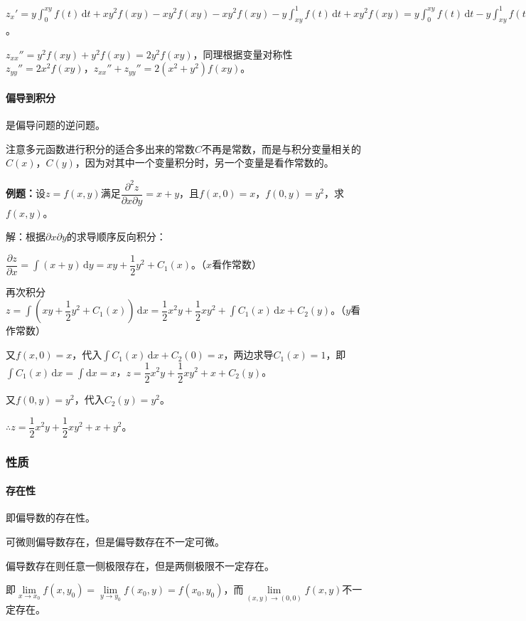 \documentclass[UTF8, 12pt]{ctexart}
\begin{document}
$z_x'=y\int_0^{xy}f(t)\,\textrm{d}t+xy^2f(xy)-xy^2f(xy)-xy^2f(xy)-y\int_{xy}^1f(t)\,\textrm{d}t+xy^2f(xy)=y\int_0^{xy}f(t)\,\textrm{d}t-y\int_{xy}^1f(t)\,\textrm{d}t$。

$z_{xx}''=y^2f(xy)+y^2f(xy)=2y^2f(xy)$，同理根据变量对称性$z_{yy}''=2x^2f(xy)$，$z_{xx}''+z_{yy}''=2(x^2+y^2)f(xy)$。

\paragraph{偏导到积分} \leavevmode \medskip

是偏导问题的逆问题。

注意多元函数进行积分的适合多出来的常数$C$不再是常数，而是与积分变量相关的$C(x)$，$C(y)$，因为对其中一个变量积分时，另一个变量是看作常数的。

\textbf{例题：}设$z=f(x,y)$满足$\dfrac{\partial^2z}{\partial x\partial y}=x+y$，且$f(x,0)=x$，$f(0,y)=y^2$，求$f(x,y)$。

解：根据$\partial x\partial y$的求导顺序反向积分：

$\dfrac{\partial z}{\partial x}=\int(x+y)\,\textrm{d}y=xy+\dfrac{1}{2}y^2+C_1(x)$。（$x$看作常数）

再次积分$z=\displaystyle{\int\left(xy+\dfrac{1}{2}y^2+C_1(x)\right)\,\textrm{d}x}=\dfrac{1}{2}x^2y+\dfrac{1}{2}xy^2+\int C_1(x)\,\textrm{d}x+C_2(y)$。（$y$看作常数）

又$f(x,0)=x$，代入$\int C_1(x)\,\textrm{d}x+C_2(0)=x$，两边求导$C_1(x)=1$，即$\int C_1(x)\,\textrm{d}x=\int\textrm{d}x=x$，$z=\dfrac{1}{2}x^2y+\dfrac{1}{2}xy^2+x+C_2(y)$。

又$f(0,y)=y^2$，代入$C_2(y)=y^2$。

$\therefore z=\dfrac{1}{2}x^2y+\dfrac{1}{2}xy^2+x+y^2$。

\subsubsection{性质}

\paragraph{存在性} \leavevmode \medskip

即偏导数的存在性。

可微则偏导数存在，但是偏导数存在不一定可微。

偏导数存在则任意一侧极限存在，但是两侧极限不一定存在。

即$\lim\limits_{x\to x_0}f(x,y_0)=\lim\limits_{y\to y_0}f(x_0,y)=f(x_0,y_0)$，而$\lim\limits_{(x,y)\to(0,0)}f(x,y)$不一定存在。
\end{document}
